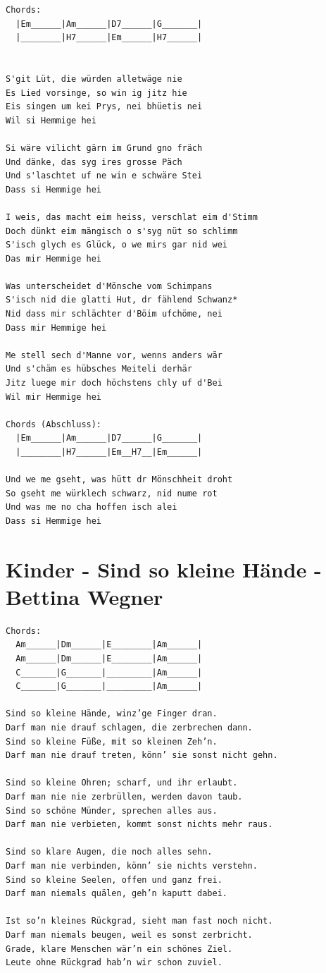 \documentclass[
]{book}
\let\stdsection\section
\renewcommand\section{\clearpage\stdsection}
\begin{document}
\begin{verbatim}
Chords:
  |Em______|Am______|D7______|G_______|
  |________|H7______|Em______|H7______|


S'git Lüt, die würden alletwäge nie
Es Lied vorsinge, so win ig jitz hie
Eis singen um kei Prys, nei bhüetis nei
Wil si Hemmige hei

Si wäre vilicht gärn im Grund gno fräch
Und dänke, das syg ires grosse Päch
Und s'laschtet uf ne win e schwäre Stei
Dass si Hemmige hei

I weis, das macht eim heiss, verschlat eim d'Stimm
Doch dünkt eim mängisch o s'syg nüt so schlimm
S'isch glych es Glück, o we mirs gar nid wei
Das mir Hemmige hei

Was unterscheidet d'Mönsche vom Schimpans
S'isch nid die glatti Hut, dr fählend Schwanz*
Nid dass mir schlächter d'Böim ufchöme, nei
Dass mir Hemmige hei

Me stell sech d'Manne vor, wenns anders wär
Und s'chäm es hübsches Meiteli derhär
Jitz luege mir doch höchstens chly uf d'Bei
Wil mir Hemmige hei

Chords (Abschluss):
  |Em______|Am______|D7______|G_______|
  |________|H7______|Em__H7__|Em______| 

Und we me gseht, was hütt dr Mönschheit droht
So gseht me würklech schwarz, nid nume rot
Und was me no cha hoffen isch alei
Dass si Hemmige hei
\end{verbatim}

\hypertarget{mundart-und-deutsch-so-kleine-haende}{%
\section{Kinder - Sind so kleine Hände - Bettina Wegner}\label{mundart-und-deutsch-so-kleine-haende}}

\begin{verbatim}
Chords:
  Am______|Dm______|E________|Am______|
  Am______|Dm______|E________|Am______|
  C_______|G_______|_________|Am______|
  C_______|G_______|_________|Am______|

Sind so kleine Hände, winz’ge Finger dran.
Darf man nie drauf schlagen, die zerbrechen dann.
Sind so kleine Füße, mit so kleinen Zeh’n.
Darf man nie drauf treten, könn’ sie sonst nicht gehn.

Sind so kleine Ohren; scharf, und ihr erlaubt.
Darf man nie nie zerbrüllen, werden davon taub.
Sind so schöne Münder, sprechen alles aus.
Darf man nie verbieten, kommt sonst nichts mehr raus.

Sind so klare Augen, die noch alles sehn.
Darf man nie verbinden, könn’ sie nichts verstehn.
Sind so kleine Seelen, offen und ganz frei.
Darf man niemals quälen, geh’n kaputt dabei.

Ist so’n kleines Rückgrad, sieht man fast noch nicht.
Darf man niemals beugen, weil es sonst zerbricht.
Grade, klare Menschen wär’n ein schönes Ziel.
Leute ohne Rückgrad hab’n wir schon zuviel.
\end{verbatim}
\end{document}
